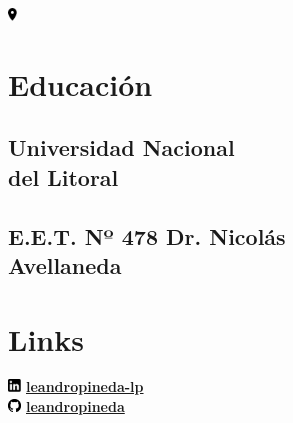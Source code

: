 \documentclass[letterpaper]{deedy-resume} %
\begin{document}
\begin{minipage}[t]{0.33\textwidth}
\hspace{0.6mm}\includegraphics[width=7pt,height=10pt]{icons/pin.pdf} 

\sectionspace %


\section{Educación} 

\subsection[unl]{Universidad Nacional\\ del Litoral}


\sectionspace %


\subsection[avellaneda]{E.E.T. Nº 478 Dr. Nicolás \\ Avellaneda}

\sectionspace %



\section{Links} 

\includegraphics[width=10pt,height=10pt]{icons/linkedin-box.pdf} \href{https://www.linkedin.com/in/leandropineda-lp}{\bf leandropineda-lp} \\
\includegraphics[width=10pt,height=10pt]{icons/github.pdf} \href{https://github.com/leandropineda}{\bf leandropineda} \\


\end{minipage}
\end{document}
